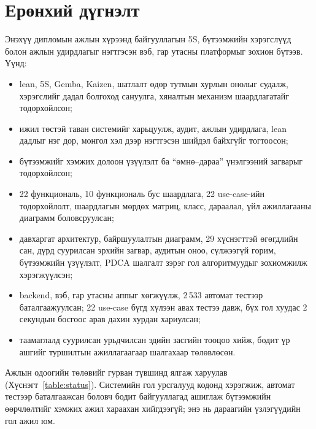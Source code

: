 
{}
\label{Summary}
\section*{Ерөнхий дүгнэлт}
Энэхүү дипломын ажлын хүрээнд байгууллагын 5S, бүтээмжийн хэрэгслүүд болон ажлын удирдлагыг нэгтгэсэн вэб, гар утасны платформыг зохион бүтээв. Үүнд:
\begin{itemize}
    \item lean, 5S, Gemba, Kaizen, шатлалт өдөр тутмын хурлын онолыг судалж, хэрэгслийг дадал болгоход сануулга, хяналтын механизм шаардлагатайг тодорхойлсон;
    \item ижил төстэй таван системийг харьцуулж, аудит, ажлын удирдлага, lean дадлыг нэг дор, монгол хэл дээр нэгтгэсэн шийдэл байхгүйг тогтоосон;
    \item бүтээмжийг хэмжих долоон үзүүлэлт ба ``өмнө--дараа'' үнэлгээний загварыг тодорхойлсон;
    \item 22 функциональ, 10 функциональ бус шаардлага, 22 use-case-ийн тодорхойлолт, шаардлагын мөрдөх матриц, класс, дараалал, үйл ажиллагааны диаграмм боловсруулсан;
    \item давхаргат архитектур, байршуулалтын диаграмм, 29 хүснэгттэй өгөгдлийн сан, дүрд суурилсан эрхийн загвар, аудитын оноо, сүлжээгүй горим, бүтээмжийн үзүүлэлт, PDCA шалгалт зэрэг гол алгоритмуудыг зохиомжилж хэрэгжүүлсэн;
    \item backend, вэб, гар утасны аппыг хөгжүүлж, 2\,533 автомат тестээр баталгаажуулсан; 22 use-case бүгд хүлээн авах тестээ давж, бүх гол хуудас 2 секундын босгоос арав дахин хурдан хариулсан;
    \item таамаглалд суурилсан урьдчилсан эдийн засгийн тооцоо хийж, бодит үр ашгийг туршилтын ажиллагаагаар шалгахаар төлөвлөсөн.
\end{itemize}

Ажлын одоогийн төлөвийг гурван түвшинд ялгаж харуулав (Хүснэгт~\ref{table:status}). Системийн гол урсгалууд кодонд хэрэгжиж, автомат тестээр баталгаажсан боловч бодит байгууллагад ашиглаж бүтээмжийн өөрчлөлтийг хэмжих ажил хараахан хийгдээгүй; энэ нь дараагийн үзлэгүүдийн гол ажил юм.

